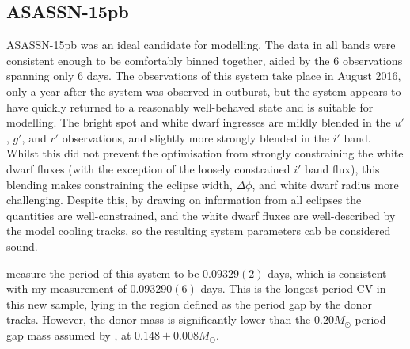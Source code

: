 \newpage
\subsection{ASASSN-15pb}

ASASSN-15pb was an ideal candidate for modelling. The data in all bands were consistent enough to be comfortably binned together, aided by the 6 observations spanning only 6 days.
The observations of this system take place in August 2016, only a year after the system was observed in outburst, but the system appears to have quickly returned to a reasonably well-behaved state and is suitable for modelling.
The bright spot and white dwarf ingresses are mildly blended in the $u'$, $g'$, and $r'$ observations, and slightly more strongly blended in the $i'$ band. Whilst this did not prevent the optimisation from strongly constraining the white dwarf fluxes (with the exception of the loosely constrained $i'$ band flux), this blending makes constraining the eclipse width, $\Delta\phi$, and white dwarf radius more challenging. Despite this, by drawing on information from all eclipses the quantities are well-constrained, and the white dwarf fluxes are well-described by the model cooling tracks, so the resulting system parameters cab be considered sound.

\citet{paterson2019} measure the period of this system to be $0.09329(2)$ days, which is consistent with my measurement of $0.093290(6)$ days.
This is the longest period CV in this new sample, lying in the region defined as the period gap by the \citet{knigge11} donor tracks. However, the donor mass is significantly lower than the $0.20 M_\odot$ period gap mass assumed by \citet{knigge11}, at $0.148\pm0.008 M_\odot$.

%     

